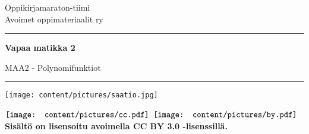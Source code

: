 
\begin{center}
    \begin{doublespace}
        \begin{LARGE}
            \textrm{Oppikirjamaraton-tiimi \\ Avoimet oppimateriaalit ry} \\
        \end{LARGE}
      
        \vspace{0.5cm}
        \hrule height 2pt
        \vspace{1cm}
        \begin{Huge}
            \textbf{\textrm{Vapaa matikka 2}}
        \end{Huge}
      
      
        \vfill
      
        \begin{huge}
            \textrm{MAA2 - Polynomifunktiot}
        \end{huge}
        \vspace{1cm}
        \hrule height 2pt
        \texttt{[image: content/pictures/saatio.jpg]}
    \end{doublespace}
\end{center}

\vfill


\begin{flushright}
    $\vcenter{\hbox{\texttt{[image: content/pictures/cc.pdf]}}}$
    $\vcenter{\hbox{\texttt{[image: content/pictures/by.pdf]}}}$
    \textbf{Sisältö on lisensoitu avoimella CC BY 3.0 -lisenssillä.}
\end{flushright}
